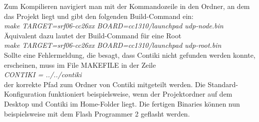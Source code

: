 Zum Kompilieren navigiert man mit der Kommandozeile in den Ordner, an dem das Projekt liegt und gibt den folgenden Build-Command ein: \\
\emph{make TARGET=srf06-cc26xx BOARD=cc1310/launchpad udp-node.bin} \\
Äquivalent dazu lautet der Build-Command für eine Root \\
\emph{make TARGET=srf06-cc26xx BOARD=cc1310/launchpad udp-root.bin} \\
Sollte eine Fehlermeldung, die besagt, dass Contiki nicht gefunden werden konnte, erscheinen, muss im File MAKEFILE in der Zeile \\
\emph{CONTIKI = ../../contiki} \\
der korrekte Pfad zum Ordner von Contiki mitgeteilt werden. Die Standard-Konfiguration funktioniert beispielsweise, wenn der Projektordner auf dem Desktop und Contiki im Home-Folder liegt. Die fertigen Binaries können nun beispielsweise mit dem Flash Programmer 2 geflasht werden. 

